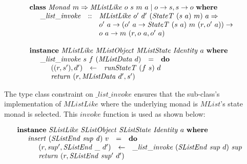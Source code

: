 \documentclass[runningheads,a4paper]{llncs}
\begin{document}
\begin{displaymath}
\begin{array}{l}
\mathbf{class}~\mathit{Monad}~m \Rightarrow \mathit{MListLike}~o~s~m~a \mid o \to s, s \to o~\mathbf{where} \\
\quad \begin{array}{lcl}
\_\mathit{list}\_\mathit{invoke} & :: & \mathit{MListLike}~o'~d'~(\mathit{StateT}~(s~a)~m)~a \Rightarrow\\
                                 &    & o'~a \to (o'~a \to \mathit{StateT}~(s~a)~m~(r,o'~a)) \to\\
                                 &    & o~a \to m~(r,o~a,o'~a)
\end{array} \\\\
\mathbf{instance}~\mathit{MListLike}~\mathit{MListObject}~\mathit{MListState}~\mathit{Identity}~a~\mathbf{where} \\
\quad \begin{array}{lcl}
\_\mathit{list}\_\mathit{invoke}~s~f~(\mathit{MListData}~d) & = & \mathbf{do} \\
\multicolumn{3}{l}{\quad \begin{array}{lcl}
((r,s'),d') & \leftarrow & \mathit{runStateT}~(f~s)~d \\
\multicolumn{3}{l}{\mathit{return}~(r,\mathit{MListData}~d',s')}
\end{array}}
\end{array}
\end{array}
\end{displaymath}

The type class constraint on $\_\mathit{list}\_\mathit{invoke}$ ensures that the sub-class's implementation of $\mathit{MListLike}$ where the underlying monad is $\mathit{MList}$'s state monad is selected. This $\mathit{invoke}$ function is used as shown below:

\begin{displaymath}
\begin{array}{l}
\mathbf{instance}~\mathit{SListLike}~\mathit{SListObject}~\mathit{SListState}~\mathit{Identity}~a~\mathbf{where} \\
\quad \begin{array}{lcl}
\mathit{insert}~(\mathit{SListEnd}~\mathit{sup}~\mathit{d})~v & = & \mathbf{do} \\
\multicolumn{3}{l}{\quad \begin{array}{lcl}
(r,\mathit{sup}',\mathit{SListEnd}~\_~d') & \leftarrow & \_\mathit{list}\_\mathit{invoke}~(\mathit{SListEnd}~\mathit{sup}~d)~\mathit{sup} \\
\multicolumn{3}{l}{\mathit{return}~(r,\mathit{SListEnd}~\mathit{sup}'~d')}
\end{array}}
\end{array}
\end{array}
\end{displaymath}
\end{document}
